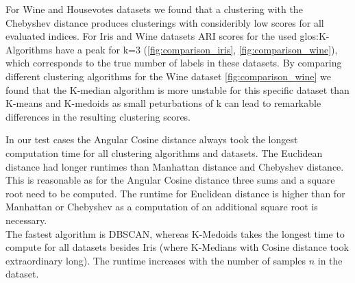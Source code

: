 


For Wine and Housevotes datasets we found that a clustering with the Chebyshev distance produces clusterings with consideribly low scores for all evaluated indices. 
For Iris and Wine datasets ARI scores for the used \Gls{glos:K-Algorithms} have a peak for k=3 (\autoref{fig:comparison_iris}, \autoref{fig:comparison_wine}), which corresponds to the true number of labels in these datasets.  
By comparing different clustering algorithms for the Wine dataset \autoref{fig:comparison_wine} we found that the K-median algorithm is more unstable for this specific dataset than K-means and K-medoids as small peturbations of k can lead to remarkable differences in the resulting clustering scores. 

In our test cases the Angular Cosine distance always took the longest computation time for all clustering algorithms and datasets. The Euclidean distance had longer runtimes than Manhattan distance and Chebyshev distance. This is reasonable as for the Angular Cosine distance three sums and a square root need to be computed. The runtime for Euclidean distance is higher than for Manhattan or Chebyshev as a computation of an additional square root is necessary.\\
The fastest algorithm is DBSCAN, whereas K-Medoids takes the longest time to compute for all datasets besides Iris (where K-Medians with Cosine distance took extraordinary long). The runtime increases with the number of samples $n$ in the dataset. 

